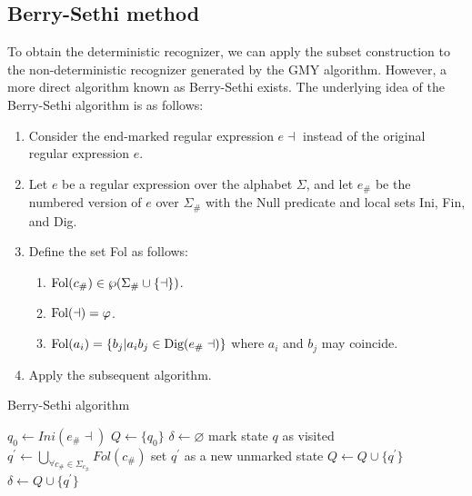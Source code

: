 \subsection{Berry-Sethi method}
To obtain the deterministic recognizer, we can apply the subset construction to the non-deterministic recognizer generated by the GMY algorithm. 
However, a more direct algorithm known as Berry-Sethi exists.
The underlying idea of the Berry-Sethi algorithm is as follows:
\begin{enumerate}
    \item Consider the end-marked regular expression $e \dashv$ instead of the original regular expression $e$.
    \item Let $e$ be a regular expression over the alphabet $\Sigma$, and let $e_{\#}$ be the numbered version of $e$ over $\Sigma_{\#}$ with the Null predicate and local sets Ini, Fin, and Dig.
    \item Define the set Fol as follows:
        \begin{enumerate}
            \item $\textnormal{Fol}(c_{\#}) \in \wp (\Sigma_{\#} \cup \{\dashv\})$. 
            \item $\textnormal{Fol}(\dashv)=\varphi$.
            \item $\textnormal{Fol}(a_i)=\{b_j|a_ib_j \in \textnormal{Dig}(e_{\#}\dashv)\}$ where $a_i$ and $b_j$ may coincide. 
        \end{enumerate} 
    \item Apply the subsequent algorithm.
\end{enumerate}
\begin{algorithm}[H]
    \caption{Berry-Sethi algorithm}
        \begin{algorithmic}[1]
            \State $q_0 \leftarrow Ini(e_{\#} \dashv)$
            \State $Q \leftarrow \{q_0\}$
            \State $\delta \leftarrow \varnothing$
                \State mark state $q$ as visited
                    \State $q^{'} \leftarrow \bigcup_{\forall c_{\#} \in \Sigma_{c_{\#}}}Fol(c_{\#})$
                            \State set $q^{'}$ as a new unmarked state
                            \State $Q \leftarrow Q \cup \{q^{'}\}$
                        \EndIf
                        \State $\delta \leftarrow Q \cup \{q^{'}\}$
                    \EndIf
                \EndFor
            \EndWhile
        \end{algorithmic}
\end{algorithm}
